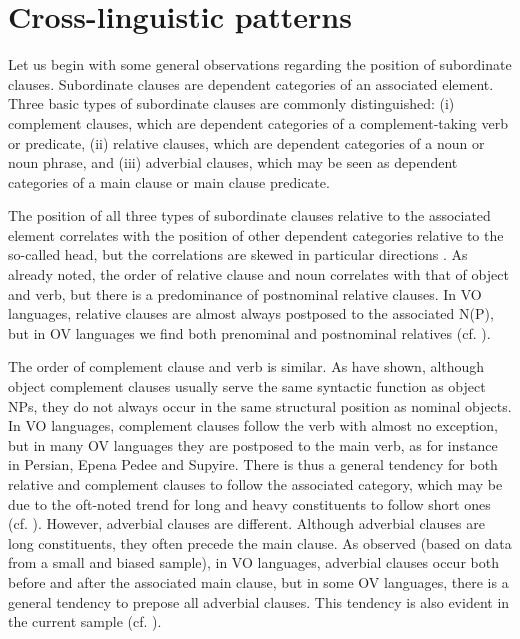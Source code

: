 \documentclass[output=paper]{langsci/langscibook}
\begin{document}
\section{Cross-linguistic patterns}\label{sec:diessel:2}

Let us begin with some general observations regarding the position of subordinate clauses. Subordinate clauses are dependent categories of an associated element. Three basic types of subordinate clauses are commonly distinguished: 
(i) complement clauses, which are dependent categories of a complement-taking verb or predicate, 
(ii) relative clauses, which are dependent categories of a noun or noun phrase, and 
(iii) adverbial clauses, which may be seen as dependent categories of a main clause or main clause predicate. 

The position of all three types of subordinate clauses relative to the associated element correlates with the position of other dependent categories relative to the so-called head, but the correlations are skewed in particular directions \citep{Diessel2001}. As \citet{Greenberg1963} already noted, the order of relative clause and noun correlates with that of object and verb, but there is a predominance of postnominal relative clauses. In VO languages, relative clauses are almost always postposed to the associated N(P), but in OV languages we find both prenominal and postnominal relatives (cf. \citealt{Dryer2005_Rel}). 

The order of complement clause and verb is similar. As \citet{Schmidtke-BodeDiessel2017} have shown, although object complement clauses usually serve the same syntactic function as object NPs, they do not always occur in the same structural position as nominal objects. In VO languages, complement clauses follow the verb with almost no exception, but in many OV languages they are postposed to the main verb, as for instance in Persian, Epena Pedee and Supyire. There is thus a general tendency for both relative and complement clauses to follow the associated category, which may be due to the oft-noted trend for long and heavy constituents to follow short ones (cf. \citealt{Behaghel1932}).
\newpage
However, adverbial clauses are different. Although adverbial clauses are long constituents, they often precede the main clause. As \citet{Diessel2001} observed (based on data from a small and biased sample), in VO languages, adverbial clauses occur both before and after the associated main clause, but in some OV languages, there is a general tendency to prepose all adverbial clauses. This tendency is also evident in the current sample (cf. ).
\end{document}

